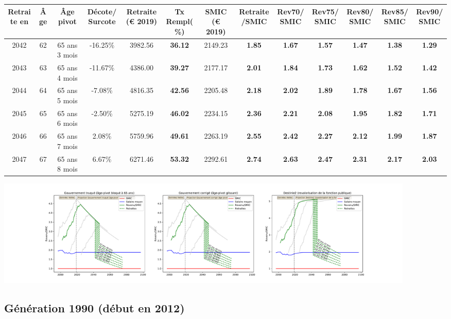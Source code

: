 { \scriptsize \begin{center} 
\begin{tabular}[htb]{|c|c||c|c||c|c||c||c|c|c|c|c|c|} 
\hline 
 Retraite en &  Âge &  Âge pivot &  Décote/Surcote &  Retraite (\euro{} 2019) &  Tx Rempl(\%) &  SMIC (\euro{} 2019) &  Retraite/SMIC &  Rev70/SMIC &  Rev75/SMIC &  Rev80/SMIC &  Rev85/SMIC &  Rev90/SMIC \\ 
\hline \hline 
 2042 &  62 &  65 ans 3 mois &  -16.25\% &  3982.56 &  {\bf 36.12} &  2149.23 &  {\bf 1.85} &  {\bf 1.67} &  {\bf 1.57} &  {\bf 1.47} &  {\bf 1.38} &  {\bf 1.29} \\ 
\hline 
 2043 &  63 &  65 ans 4 mois &  -11.67\% &  4386.00 &  {\bf 39.27} &  2177.17 &  {\bf 2.01} &  {\bf 1.84} &  {\bf 1.73} &  {\bf 1.62} &  {\bf 1.52} &  {\bf 1.42} \\ 
\hline 
 2044 &  64 &  65 ans 5 mois &  -7.08\% &  4816.35 &  {\bf 42.56} &  2205.48 &  {\bf 2.18} &  {\bf 2.02} &  {\bf 1.89} &  {\bf 1.78} &  {\bf 1.67} &  {\bf 1.56} \\ 
\hline 
 2045 &  65 &  65 ans 6 mois &  -2.50\% &  5275.19 &  {\bf 46.02} &  2234.15 &  {\bf 2.36} &  {\bf 2.21} &  {\bf 2.08} &  {\bf 1.95} &  {\bf 1.82} &  {\bf 1.71} \\ 
\hline 
 2046 &  66 &  65 ans 7 mois &  2.08\% &  5759.96 &  {\bf 49.61} &  2263.19 &  {\bf 2.55} &  {\bf 2.42} &  {\bf 2.27} &  {\bf 2.12} &  {\bf 1.99} &  {\bf 1.87} \\ 
\hline 
 2047 &  67 &  65 ans 8 mois &  6.67\% &  6271.46 &  {\bf 53.32} &  2292.61 &  {\bf 2.74} &  {\bf 2.63} &  {\bf 2.47} &  {\bf 2.31} &  {\bf 2.17} &  {\bf 2.03} \\ 
\hline 
\hline 
\end{tabular} 
\end{center} } 

 \begin{center}\includegraphics[width=0.9\textwidth]{fig/Magistrat_1980_22_dest_retraite.pdf}\end{center} \label{fig/Magistrat_1980_22_dest_retraite.pdf} 

\newpage 
 
\subsection{Génération 1990 (début en 2012)} 

